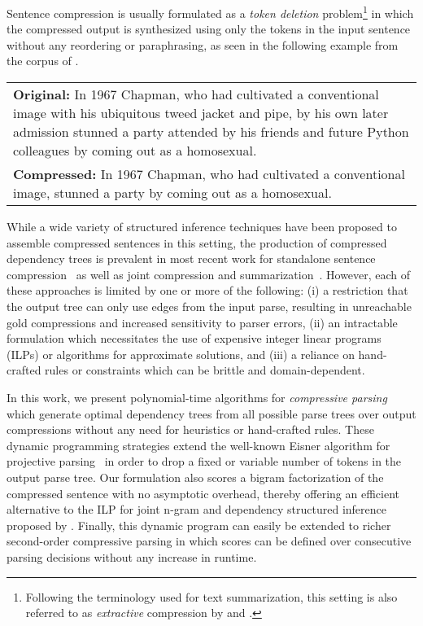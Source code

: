 \documentclass[11pt,a4paper]{article}
\begin{document}
Sentence compression is usually formulated as a \textit{token deletion}
problem\footnote{Following the terminology used for text
    summarization, this setting is also referred to as \emph{extractive}
    compression by  and .}
in which the compressed output is synthesized using only the
tokens in the input sentence without any reordering or paraphrasing,
as seen in the following example from the corpus of
.

\begin{tabular}{p{190pt}}
    \small\vspace{0pt}
\textbf{Original:} In 1967 Chapman, who had cultivated a
    conventional image with his ubiquitous tweed jacket and pipe, by his own
    later admission stunned a party attended by his friends and future Python
    colleagues by coming out as a homosexual.\\[4pt]
        \small
\textbf{Compressed:} In 1967 Chapman, who had cultivated a
conventional image, stunned a party by coming out as a homosexual.\\[4pt]
\end{tabular}
While a wide variety of structured inference techniques have been
proposed to
assemble compressed sentences in this setting, the production of
compressed dependency trees is prevalent in most recent work for
standalone sentence
compression~\cite{filippova08a,nomoto09,galanis10,thadani13a,filippova13,thadani14}
as well as joint compression and
summarization~\cite{martins09a,almeida13,qian13}. However, each of these
approaches is limited by one or more of the following: (i) a restriction
that the output tree can only use edges from the input parse,
resulting in unreachable gold compressions and increased sensitivity to
parser errors,
(ii) an intractable formulation which necessitates the use of expensive
integer linear programs (ILPs) or algorithms for approximate solutions,
and (iii) a reliance on hand-crafted rules or constraints which can be
brittle and domain-dependent.

In this work, we present polynomial-time algorithms for
\emph{compressive parsing} which generate optimal dependency trees
from all possible parse trees over output compressions without any need for
heuristics or hand-crafted rules.
These dynamic programming strategies extend the well-known Eisner
algorithm for projective parsing~\cite{eisner96}
in order to drop a fixed or variable number of tokens
in the output parse tree.
Our formulation also scores a bigram
factorization of the compressed sentence with no asymptotic overhead,
thereby offering an efficient alternative to the ILP for joint n-gram and
dependency structured inference proposed by .
Finally, this dynamic program can easily be extended to richer
second-order compressive parsing \cite{eisner96,mcdonald06b} in
which scores can be defined over consecutive parsing decisions without
any increase in runtime.
\end{document}
